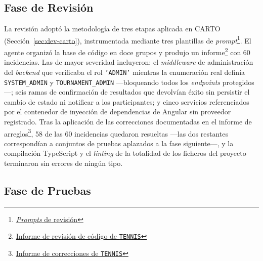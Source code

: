 \subsection{Fase de Revisión}

La revisión adoptó la metodología de tres etapas aplicada en \ac{CARTO} (Sección~\ref{sec:dev-carto}), instrumentada mediante tres plantillas de \textit{prompt}\footnote{\href{https://github.com/alu0101549491/TFG-Fabian-Gonzalez-Lence/tree/main/resources/prompts/5-TennisTournamentManager/4-RevisionDelCodigo}{\textit{Prompts} de revisión}}. El agente organizó la base de código en doce grupos y produjo un informe\footnote{\href{https://github.com/alu0101549491/TFG-Fabian-Gonzalez-Lence/blob/main/projects/5-TennisTournamentManager/docs/review_reports/TENNIS_review_report.md}{Informe de revisión de código de \texttt{TENNIS}}} con 60 incidencias. Las de mayor severidad incluyeron: el \textit{middleware} de administración del \textit{backend} que verificaba el rol \texttt{'ADMIN'} mientras la enumeración real definía \texttt{SYSTEM\_ADMIN} y \texttt{TOURNAMENT\_ADMIN} ---bloqueando todos los \textit{endpoints} protegidos---; seis ramas de confirmación de resultados que devolvían éxito sin persistir el cambio de estado ni notificar a los participantes; y cinco servicios referenciados por el contenedor de inyección de dependencias de Angular sin proveedor registrado. Tras la aplicación de las correcciones documentadas en el informe de arreglos\footnote{\href{https://github.com/alu0101549491/TFG-Fabian-Gonzalez-Lence/blob/main/projects/5-TennisTournamentManager/docs/review_reports/TENNIS_fix_report.md}{Informe de correcciones de \texttt{TENNIS}}}, 58 de las 60 incidencias quedaron resueltas ---las dos restantes correspondían a conjuntos de pruebas aplazados a la fase siguiente---, y la compilación TypeScript y el \textit{linting} de la totalidad de los ficheros del proyecto terminaron sin errores de ningún tipo.

\subsection{Fase de Pruebas}

